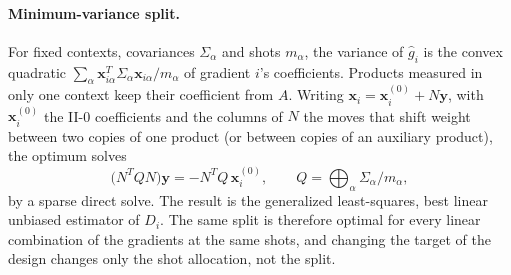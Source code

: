 \documentclass[aps,pra,reprint,superscriptaddress,nofootinbib]{revtex4-2}
\begin{document}
\paragraph{Minimum-variance split.} For fixed contexts, covariances $\Sigma_\alpha$ and shots $m_\alpha$, the variance of $\hat g_i$ is the convex quadratic $\sum_\alpha\boldsymbol x_{i\alpha}^T\Sigma_\alpha\boldsymbol x_{i\alpha}/m_\alpha$ of gradient $i$'s coefficients. Products measured in only one context keep their coefficient from $A$. Writing $\boldsymbol x_i=\boldsymbol x_i^{(0)}+N\boldsymbol y$, with $\boldsymbol x_i^{(0)}$ the II-0 coefficients and the columns of $N$ the moves that shift weight between two copies of one product (or between copies of an auxiliary product), the optimum solves
\begin{equation}
\big(N^TQN\big)\boldsymbol y=-N^TQ\,\boldsymbol x_i^{(0)},\qquad Q=\bigoplus_\alpha\Sigma_\alpha/m_\alpha ,
\label{eq:gls}
\end{equation}
by a sparse direct solve. The result is the generalized least-squares, best linear unbiased estimator of $D_i$. The same split is therefore optimal for every linear combination of the gradients at the same shots, and changing the target of the design changes only the shot allocation, not the split.
\end{document}
